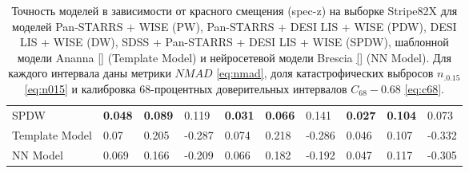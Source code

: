 \documentclass[fleqn,usenatbib]{mnras}
\begin{document}
\begin{table}
\begin{tabular}{llllllllll}
            SPDW           &                        \textbf{0.048} &  \textbf{0.089} &            0.119 &                        \textbf{0.031} &  \textbf{0.066} &           0.141 &                  \textbf{0.027} &  \textbf{0.104} &            0.073 \\
            Template Model &                                  0.07 &           0.205 &           -0.287 &                                 0.074 &           0.218 &          -0.286 &                           0.046 &           0.107 &           -0.332 \\
            NN Model       &                                 0.069 &           0.166 &           -0.209 &                                 0.066 &           0.182 &          -0.192 &                           0.047 &           0.117 &           -0.305 \\
            \hline
            \end{tabular}
            \caption{Точность моделей в зависимости от красного смещения (spec-z) на выборке Stripe82X для моделей Pan-STARRS + WISE (PW), Pan-STARRS + DESI LIS + WISE (PDW), DESI LIS + WISE (DW), SDSS + Pan-STARRS + DESI LIS + WISE (SPDW), шаблонной модели Ananna \ref{} (Template Model) и нейросетевой модели Brescia \ref{} (NN Model). Для каждого интервала даны метрики $NMAD$ \eqref{eq:nmad}, доля катастрофических выбросов $n_{.0.15}$ \eqref{eq:n015} и калибровка 68-процентных доверительных интервалов $C_{68} - 0.68$ \eqref{eq:c68}.}
\end{table}
\end{document}
